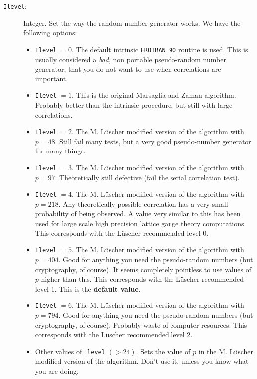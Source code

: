 \begin{description}
\item[\texttt{Ilevel}:] Integer. Set the way the random number
  generator works. We have the following options:
  \begin{itemize}
  \item \texttt{Ilevel} $=0$. The default intrinsic \texttt{FROTRAN
      90} routine is used. This is usually considered a \emph{bad},
    non portable pseudo-random number generator, that you do not want
    to use when correlations are important.
  \item \texttt{Ilevel} $=1$. This is the original Marsaglia and
    Zaman algorithm. Probably better than the intrinsic procedure, but
    still with large correlations.
  \item \texttt{Ilevel} $=2$. The M. L\"uscher modified version of the
    algorithm with $p=48$. Still fail many tests, but a very good
    pseudo-number generator for many things.
  \item \texttt{Ilevel} $=3$. The M. L\"uscher modified version of the
    algorithm with $p=97$. Theoretically still defective (fail the
    serial correlation test).
  \item \texttt{Ilevel} $=4$. The M. L\"uscher modified version of the
    algorithm with $p=218$. Any theoretically possible correlation has
    a very small probability of being observed. A value very similar
    to this has been
    used for large scale high precision lattice gauge theory
    computations. This corresponds with the L\"uscher recommended level
    0. 
  \item \texttt{Ilevel} $=5$. The M. L\"uscher modified version of the
    algorithm with $p=404$. Good for
    anything you need the pseudo-random numbers (but cryptography, of
    course). It seems completely pointless to use values of $p$ higher
    than this.  This corresponds with the L\"uscher recommended level
    1. This is the \textbf{default value}.
  \item \texttt{Ilevel} $=6$. The M. L\"uscher modified version of the
    algorithm with $p=794$. Good for
    anything you need the pseudo-random numbers (but cryptography, of
    course). Probably waste of computer resources.  This corresponds
    with the L\"uscher recommended level 2. 
  \item Other values of \texttt{Ilevel} $(>24)$. Sets the value of $p$
    in the M. L\"uscher modified version of the algorithm. Don't use
    it, unless you know what you are doing. 
  \end{itemize}
\end{description}

